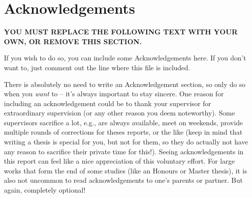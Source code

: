 \chapter*{Acknowledgements}

\textbf{YOU MUST REPLACE THE FOLLOWING TEXT WITH YOUR OWN, OR REMOVE THIS SECTION.}

If you wish to do so, you can include some Acknowledgements here. If you don't want to, just comment out the line where this file is included.

There is absolutely no need to write an Acknowledgement section, so only do so when you \emph{want} to -- it's always important to stay sincere. One reason for including an acknowledgement could be to thank your supervisor for extraordinary supervision (or any other reason you deem noteworthy). Some supervisors sacrifice a lot, e.g., are always available, meet on weekends, provide multiple rounds of corrections for theses reports, or the like (keep in mind that writing a thesis is special for you, but not for them, so they do actually not have any reason to sacrifice their private time for this!). Seeing acknowledgements in this report can feel like a nice appreciation of this voluntary effort. For large works that form the end of some studies (like an Honours or Master thesis), it is also not uncommon to read acknowledgements to one's parents or partner. But again, completely optional!